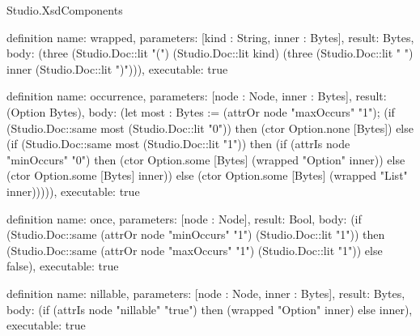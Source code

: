 \begin{lexlean}{Studio.XsdComponents}
\begin{semanticmodule}
definition{
  name: wrapped,
  parameters: [kind : String, inner : Bytes],
  result: Bytes,
  body: (three (Studio.Doc::lit "(") (Studio.Doc::lit kind) (three (Studio.Doc::lit " ") inner (Studio.Doc::lit ")"))),
  executable: true
}

definition{
  name: occurrence,
  parameters: [node : Node, inner : Bytes],
  result: (Option Bytes),
  body: (let most : Bytes := (attrOr node "maxOccurs" "1"); (if (Studio.Doc::same most (Studio.Doc::lit "0")) then (ctor Option.none [Bytes]) else (if (Studio.Doc::same most (Studio.Doc::lit "1")) then (if (attrIs node "minOccurs" "0") then (ctor Option.some [Bytes] (wrapped "Option" inner)) else (ctor Option.some [Bytes] inner)) else (ctor Option.some [Bytes] (wrapped "List" inner))))),
  executable: true
}

definition{
  name: once,
  parameters: [node : Node],
  result: Bool,
  body: (if (Studio.Doc::same (attrOr node "minOccurs" "1") (Studio.Doc::lit "1")) then (Studio.Doc::same (attrOr node "maxOccurs" "1") (Studio.Doc::lit "1")) else false),
  executable: true
}

definition{
  name: nillable,
  parameters: [node : Node, inner : Bytes],
  result: Bytes,
  body: (if (attrIs node "nillable" "true") then (wrapped "Option" inner) else inner),
  executable: true
}


\end{semanticmodule}
\end{lexlean}
